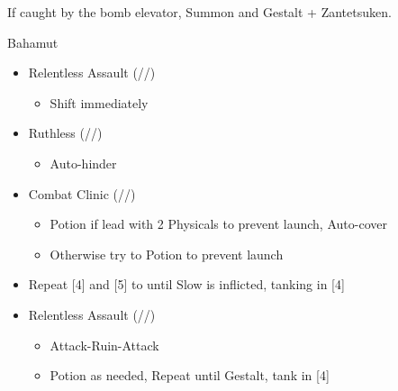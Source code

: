 If caught by the bomb elevator, Summon and Gestalt + Zantetsuken. 
\renewcommand{\first}{[1] Relentless Assault (\com/\rav/\rav)}
\renewcommand{\fifth}{[5] Ruthless (\sab/\com/\rav)
\renewcommand{\fourth}{[4] Combat Clinic (\sen/\med/\med)}}
\begin{battle}{Bahamut}
\begin{multicols}{2}
\begin{itemize}
    \item \first
    \begin{itemize}
        \item Shift immediately
    \end{itemize}
    \item \fifth
    \begin{itemize}
        \item Auto-hinder
    \end{itemize}
    \item \fourth
    \begin{itemize}
        \item Potion if lead with 2 Physicals to prevent launch, Auto-cover
        \item Otherwise try to Potion to prevent launch
    \end{itemize}
    \columnbreak
    \item Repeat [4] and [5] to until Slow is inflicted, tanking in [4]
    \item \first
    \begin{itemize}
        \item Attack-Ruin-Attack
        \item Potion as needed, Repeat until Gestalt, tank in [4]
    \end{itemize}
\end{itemize}
\end{multicols}
\end{battle}
